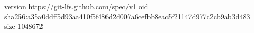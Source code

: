 version https://git-lfs.github.com/spec/v1
oid sha256:a35a0ddff5d93aa410f5f486d2d007a6cefbb8eac5f21147d977c2cb9ab3d483
size 1048672
